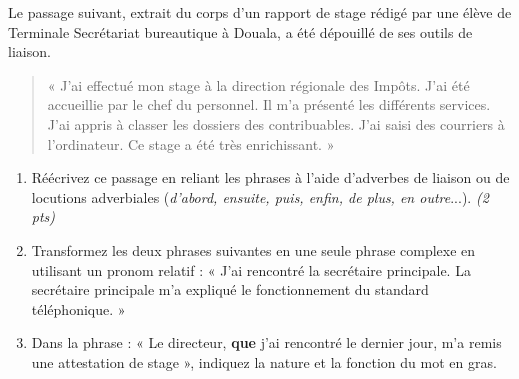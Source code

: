 \documentclass[11pt]{article}
\begin{document}
\begin{exercice}
Le passage suivant, extrait du corps d'un rapport de stage rédigé par une élève de Terminale Secrétariat bureautique à Douala, a été dépouillé de ses outils de liaison.

\begin{quote}
« J'ai effectué mon stage à la direction régionale des Impôts. J'ai été accueillie par le chef du personnel. Il m'a présenté les différents services. J'ai appris à classer les dossiers des contribuables. J'ai saisi des courriers à l'ordinateur. Ce stage a été très enrichissant. »
\end{quote}

\begin{enumerate}
\item Réécrivez ce passage en reliant les phrases à l'aide d'adverbes de liaison ou de locutions adverbiales (\textit{d'abord, ensuite, puis, enfin, de plus, en outre}...). \textit{(2 pts)}
\item Transformez les deux phrases suivantes en une seule phrase complexe en utilisant un pronom relatif : « J'ai rencontré la secrétaire principale. La secrétaire principale m'a expliqué le fonctionnement du standard téléphonique. »
\item Dans la phrase : « Le directeur, \textbf{que} j'ai rencontré le dernier jour, m'a remis une attestation de stage », indiquez la nature et la fonction du mot en gras.
\end{enumerate}
\end{exercice}
\end{document}
